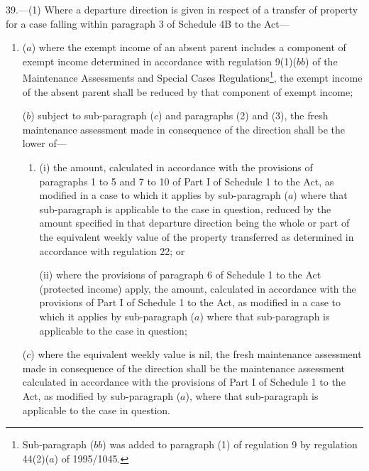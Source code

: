 \documentclass[12pt,a4paper]{article}
\begin{document}
39.—(1)
Where a departure direction is given in respect of a transfer of property for a
case falling within paragraph 3 of Schedule 4B to the Act—
\begin{enumerate}\item[]
($a$) where the exempt income of an absent parent includes a component of exempt
income determined in accordance with regulation 9(1)($bb$) of the Maintenance
Assessments and Special Cases Regulations\footnote{\frenchspacing Sub-paragraph ($bb$) was added to paragraph (1) of regulation 9 by regulation 44(2)($a$) of 1995/1045.}, the exempt income of the absent
parent shall be reduced by that component of exempt income;


($b$) subject to sub-paragraph ($c$) and paragraphs (2) and (3), the fresh maintenance assessment made in consequence of the direction shall be the lower of—
\begin{enumerate}\item[]
(i) the amount, calculated in accordance with the provisions of paragraphs 1 to 5 and 7 to 10 of Part I of Schedule 1 to the Act, as modified in a case to which it applies by sub-paragraph ($a$) where that sub-paragraph is applicable to the case in question, reduced by the amount specified in that departure direction being the whole or part of the equivalent weekly value of the property transferred as determined in accordance with regulation 22; or

(ii) where the provisions of paragraph 6 of Schedule 1 to the Act (protected income) apply, the amount, calculated in accordance with the provisions of Part I of Schedule 1 to the Act, as modified in a case to which it applies by sub-paragraph ($a$) where that sub-paragraph is applicable to the case in question;
\end{enumerate}

($c$) where the equivalent weekly value is nil, the fresh maintenance assessment
made in consequence of the direction shall be the maintenance assessment
calculated in accordance with the provisions of Part I of Schedule 1 to the Act,
as modified by sub-paragraph ($a$), where that sub-paragraph is applicable to the
case in question.
\end{enumerate}
\end{document}
